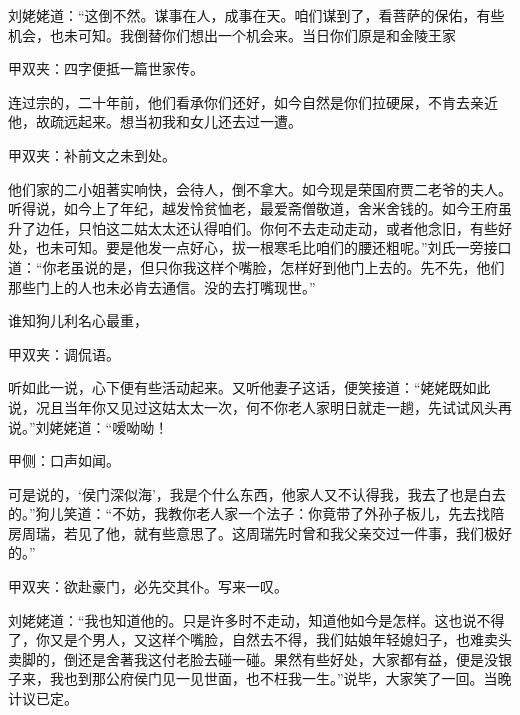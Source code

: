 \begin{parag}
    刘姥姥道：“这倒不然。谋事在人，成事在天。咱们谋到了，看菩萨的保佑，有些机会，也未可知。我倒替你们想出一个机会来。当日你们原是和金陵王家\begin{note}甲双夹：四字便抵一篇世家传。\end{note}连过宗的，二十年前，他们看承你们还好，如今自然是你们拉硬屎，不肯去亲近他，故疏远起来。想当初我和女儿还去过一遭。\begin{note}甲双夹：补前文之未到处。\end{note}他们家的二小姐著实响快，会待人，倒不拿大。如今现是荣国府贾二老爷的夫人。听得说，如今上了年纪，越发怜贫恤老，最爱斋僧敬道，舍米舍钱的。如今王府虽升了边任，只怕这二姑太太还认得咱们。你何不去走动走动，或者他念旧，有些好处，也未可知。要是他发一点好心，拔一根寒毛比咱们的腰还粗呢。”刘氏一旁接口道：“你老虽说的是，但只你我这样个嘴脸，怎样好到他门上去的。先不先，他们那些门上的人也未必肯去通信。没的去打嘴现世。”
\end{parag}


\begin{parag}
    谁知狗儿利名心最重，\begin{note}甲双夹：调侃语。\end{note}听如此一说，心下便有些活动起来。又听他妻子这话，便笑接道：“姥姥既如此说，况且当年你又见过这姑太太一次，何不你老人家明日就走一趟，先试试风头再说。”刘姥姥道：“嗳呦呦！\begin{note}甲侧：口声如闻。\end{note}可是说的，‘侯门深似海’，我是个什么东西，他家人又不认得我，我去了也是白去的。”狗儿笑道：“不妨，我教你老人家一个法子：你竟带了外孙子板儿，先去找陪房周瑞，若见了他，就有些意思了。这周瑞先时曾和我父亲交过一件事，我们极好的。”\begin{note}甲双夹：欲赴豪门，必先交其仆。写来一叹。\end{note}刘姥姥道：“我也知道他的。只是许多时不走动，知道他如今是怎样。这也说不得了，你又是个男人，又这样个嘴脸，自然去不得，我们姑娘年轻媳妇子，也难卖头卖脚的，倒还是舍著我这付老脸去碰一碰。果然有些好处，大家都有益，便是没银子来，我也到那公府侯门见一见世面，也不枉我一生。”说毕，大家笑了一回。当晚计议已定。
\end{parag}


